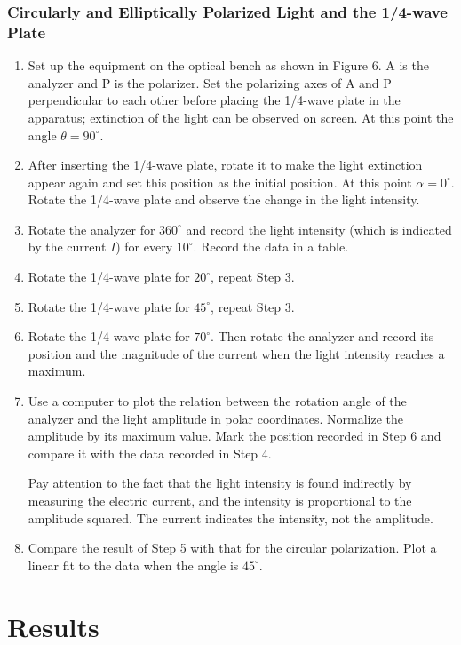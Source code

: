 \documentclass{article}
\begin{document}
\subsubsection{Circularly and Elliptically Polarized Light and the 1/4-wave Plate}
\begin{enumerate}
	\item Set up the equipment on the optical bench as shown in Figure 6. A is the analyzer and P is the polarizer. Set the polarizing axes of A and P perpendicular to each other before placing the 1/4-wave plate in the apparatus; extinction of the light can be observed on screen. At this point the angle $ \theta=90^\circ. $
	\item After inserting the 1/4-wave plate, rotate it to make the light extinction appear again and set this position as the initial position. At this point $ \alpha=0^\circ $. Rotate the 1/4-wave plate and observe the change in the light intensity.
	\item Rotate the analyzer for $ 360^\circ $ and record the light intensity (which is indicated by the current $ I $) for every $ 10^\circ $. Record the data in a table.
	\item Rotate the 1/4-wave plate for $ 20^\circ $, repeat Step 3.
	\item Rotate the 1/4-wave plate for $ 45^\circ $, repeat Step 3.
	\item Rotate the 1/4-wave plate for $ 70^\circ $. Then rotate the analyzer and record its position	and the magnitude of the current when the light intensity reaches a maximum.
	\item Use a computer to plot the relation between the rotation angle of the analyzer and the light amplitude in polar coordinates. Normalize the amplitude by its maximum value. Mark the position recorded in Step 6 and compare it with the data recorded in Step 4.
	
	Pay attention to the fact that the light intensity is found indirectly by measuring the electric current, and the intensity is proportional to the amplitude squared. The current indicates the intensity, not the amplitude.
	\item Compare the result of Step 5 with that for the circular polarization. Plot a linear fit to the data when the angle is $ 45^\circ $.
\end{enumerate}

\newpage

\section{Results}
\end{document}
